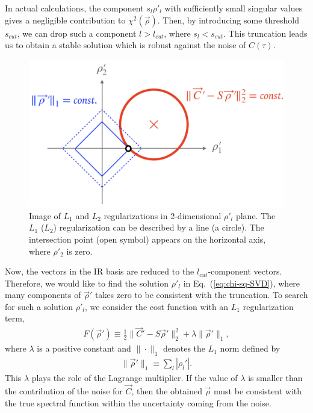 \documentclass[a4paper,11pt]{article}
\newcommand\beq{ \begin{eqnarray} }
\newcommand\eeq{ \end{eqnarray} }
\begin{document}
In actual calculations, the component  $s_l\rho'_l$ with sufficiently small singular values  gives a negligible contribution to $\chi^2 (\vec{\rho})$.
Then, by introducing some threshold $s_{cut}$, we can drop such a component $l > l_{cut}$, where $s_{l} < s_{cut}$. 
This truncation leads us to obtain a stable solution which is robust against the noise of $C(\tau)$.
\begin{figure}[h]
\begin{center}
\includegraphics[scale=0.4]{./L1-reg.pdf}
\caption{Image of $L_1$ and $L_2$ regularizations in 2-dimensional $\rho'_l$ plane. The $L_1$ ($L_2$) regularization can be described by a line (a circle).
The intersection point (open symbol) appears on the horizontal axis, where $\rho'_2$ is zero.
}
\label{fig:L1-reg}
\end{center}
\end{figure}

Now, the vectors in the IR basis are reduced to the $l_{cut}$-component vectors.
Therefore,  we would like to find the solution $\rho'_l$  in Eq.~(\ref{eq:chi-sq-SVD}), where  many components of $\vec{\rho}'$ takes zero to be consistent with the truncation.
To search for such a solution $\rho'_l$, we consider the cost function with an $L_1$ regularization term,
\beq
F(\vec{\rho}') \equiv \frac{1}{2} \| \vec{C}' - S \vec{\rho}'  \|_2^2 + \lambda \| \vec{\rho}' \|_1,\label{eq:cost-fn-L1}
\eeq 
where $\lambda$ is a positive constant and $\| \cdot \|_1$ denotes the $L_1$ norm defined by
\beq
\| \vec{\rho}' \|_1 \equiv \sum_l | \rho_l'|.
\eeq
This $\lambda$ plays the role of the Lagrange multiplier.
If the value of $\lambda$ is smaller than the contribution of the noise for $\vec{C}$, then the obtained $\vec{\rho}$ must be consistent with the true spectral function within the uncertainty coming from the noise.
\end{document}
